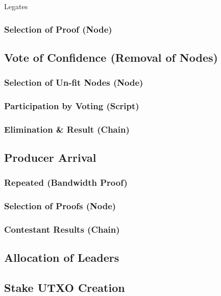 \documentclass[a4paper,11pt]{article}
\begin{document}
Legates

\subsubsection{Selection of Proof (Node)}

\subsection{Vote of Confidence (Removal of Nodes)}

\subsubsection{Selection of Un-fit Nodes (Node)}

\subsubsection{Participation by Voting (Script)}

\subsubsection{Elimination \& Result (Chain)}

\subsection{Producer Arrival}

\subsubsection{Repeated (Bandwidth Proof)}

\subsubsection{Selection of Proofs (Node)}

\subsubsection{Contestant Results (Chain)}

\subsection{Allocation of Leaders}

\subsection{Stake UTXO Creation}
\end{document}

